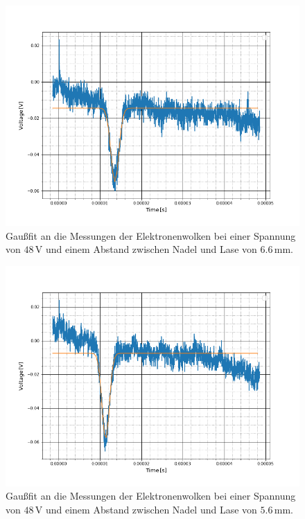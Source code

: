 \begin{figure}
	\includegraphics[scale=0.5]{Bild/S5}
	\centering
	\caption[Gaußfit an Messung bei Konst. Spannung 5]{Gaußfit an die Messungen der Elektronenwolken bei einer Spannung von $48\,$V und einem Abstand zwischen Nadel und Lase von $6.6$\,mm.}
\end{figure}
\begin{figure}
	\includegraphics[scale=0.5]{Bild/S6}
	\centering
	\caption[Gaußfit an Messung bei Konst. Spannung 6]{Gaußfit an die Messungen der Elektronenwolken bei einer Spannung von $48\,$V und einem Abstand zwischen Nadel und Lase von $5.6$\,mm.}
\end{figure}

